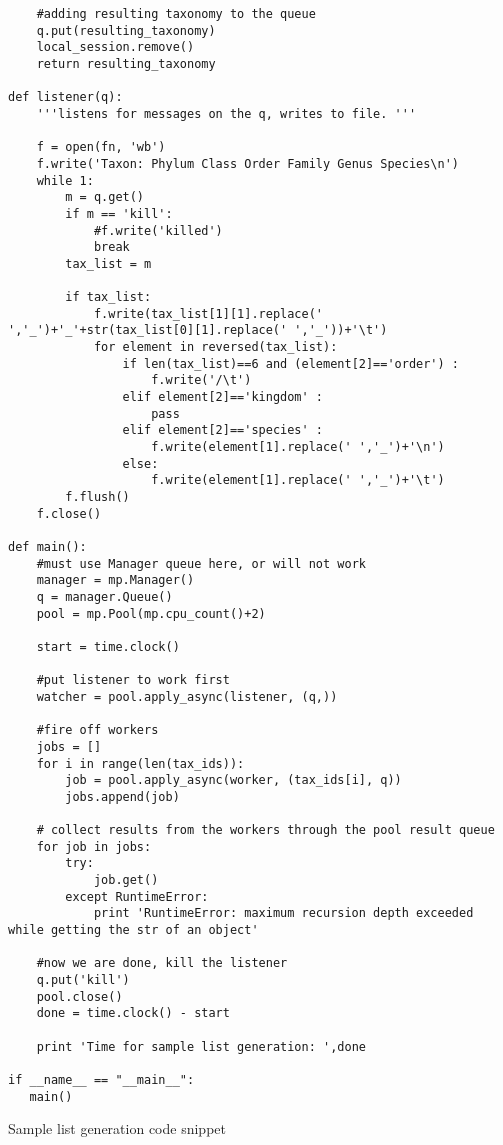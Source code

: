 \documentclass[a4paper,11pt]{article}
\begin{document}
\begin{lstlisting}
    #adding resulting taxonomy to the queue
    q.put(resulting_taxonomy)
    local_session.remove()
    return resulting_taxonomy

def listener(q):
    '''listens for messages on the q, writes to file. '''

    f = open(fn, 'wb') 
    f.write('Taxon: Phylum Class Order Family Genus Species\n')
    while 1:
        m = q.get()
        if m == 'kill':
            #f.write('killed')
            break
        tax_list = m
        
        if tax_list:
            f.write(tax_list[1][1].replace(' ','_')+'_'+str(tax_list[0][1].replace(' ','_'))+'\t')
            for element in reversed(tax_list):
                if len(tax_list)==6 and (element[2]=='order') :
                    f.write('/\t')
                elif element[2]=='kingdom' :
                    pass
                elif element[2]=='species' :
                    f.write(element[1].replace(' ','_')+'\n')
                else:
                    f.write(element[1].replace(' ','_')+'\t')
        f.flush()
    f.close()

def main():
    #must use Manager queue here, or will not work
    manager = mp.Manager()
    q = manager.Queue()    
    pool = mp.Pool(mp.cpu_count()+2)
    
    start = time.clock()

    #put listener to work first
    watcher = pool.apply_async(listener, (q,))

    #fire off workers
    jobs = []
    for i in range(len(tax_ids)):
        job = pool.apply_async(worker, (tax_ids[i], q))
        jobs.append(job)

    # collect results from the workers through the pool result queue
    for job in jobs: 
        try:
            job.get()
        except RuntimeError:
            print 'RuntimeError: maximum recursion depth exceeded while getting the str of an object'

    #now we are done, kill the listener
    q.put('kill')
    pool.close()
    done = time.clock() - start
    
    print 'Time for sample list generation: ',done

if __name__ == "__main__":
   main()
\end{lstlisting}

Sample list generation code snippet
\end{document}
